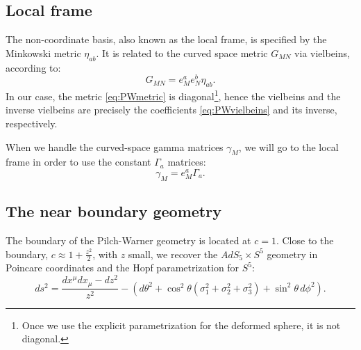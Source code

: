 \subsection{Local frame}\label{sec:localframe}
The non-coordinate basis, also known as the local frame, is specified by the Minkowski metric $\eta_{a b}$. It is related to the curved space metric $G_{M N}$ via vielbeins, according to:
\begin{equation*}
 G_{M N} = e^a_M e^b_N \eta_{a b}.
\end{equation*}
In our case, the metric \eqref{eq:PWmetric} is diagonal\footnote{Once we use the explicit parametrization for the deformed sphere, it is not diagonal.}, hence the vielbeins and the inverse vielbeins are precisely the coefficients \eqref{eq:PWvielbeins} and its inverse, respectively.

When we handle the curved-space gamma matrices $\gamma_{M}$, we will go to the local frame in order to use the constant $\Gamma_a$ matrices:
\begin{equation*}
 \gamma_{M} = e^a_M \Gamma_{a}.
\end{equation*}




\subsection{The near boundary geometry}

The boundary of the Pilch-Warner geometry is located at $c = 1$. 
Close to the boundary, $c \approx 1 + \frac{z^2}{2}$, with $z$ small, we recover the $AdS_5 \times S^5$ geometry in Poincare coordinates and the Hopf parametrization for $S^5$:
\begin{equation}\label{eq:AdS5xS5metric}
ds^2=\dfrac{dx^{\mu } dx_{\mu}-dz^2}{z^2}-\left(d\theta^2+\cos^2\theta \left(\sigma_1^2+\sigma_2^2+\sigma_3^2\right)+\sin^2\theta \,d\phi^2 \right).
\end{equation}
